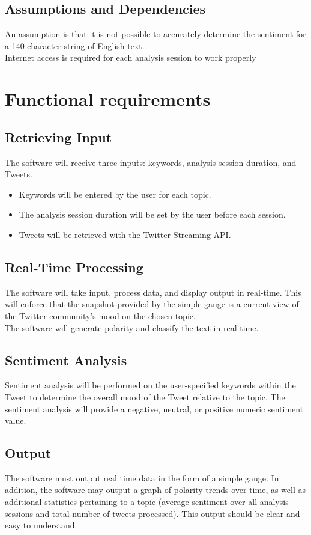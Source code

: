 \subsection{Assumptions and Dependencies}
An assumption is that it is not possible to accurately determine the sentiment     for a  140    character string of English text.\\
Internet access is required for each analysis session to work properly

\section{Functional requirements}
\subsection{Retrieving Input}
The software will receive three inputs: keywords, analysis session duration, and Tweets.
\begin{itemize}
	\item Keywords will be entered by the user for each topic.
	\item The analysis session duration will be set by the user before each session.
	\item Tweets will be retrieved with the Twitter Streaming API.
	 
\end{itemize}
\subsection{Real-Time Processing}
The software will take input, process data, and display output in real-time. This will enforce that the snapshot provided by the simple gauge is a current view of the Twitter community's mood on the chosen topic.\\
The software will generate polarity and classify the text in real time.
\subsection{Sentiment Analysis}
Sentiment analysis will be performed on the user-specified keywords within the Tweet to determine the overall mood of the Tweet relative to the topic. The sentiment analysis will provide a negative, neutral, or positive numeric sentiment value.
\subsection{Output}
The software must output real time data in the form of a simple gauge. In addition, the software may output a graph of polarity trends over time, as well as additional statistics pertaining to a topic (average sentiment over all analysis sessions and total number of tweets processed). This output should be clear and easy to understand.


